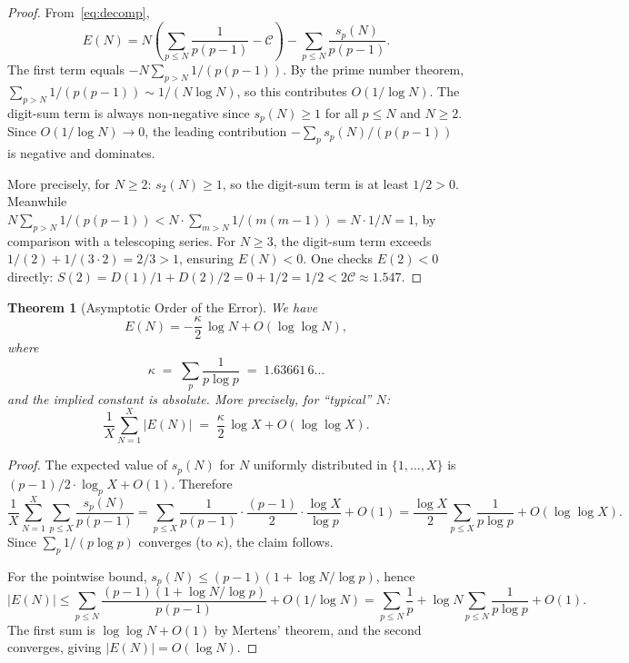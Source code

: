 \documentclass[11pt,a4paper]{amsart}
\theoremstyle{plain}
\newtheorem{theorem}{Theorem}[section]
\theoremstyle{definition}
\begin{document}
\begin{proof}
From~\eqref{eq:decomp},
\[
E(N) = N\!\left(\sum_{p \le N} \frac{1}{p(p-1)} - \mathcal{C}\right) - \sum_{p \le N} \frac{s_p(N)}{p(p-1)}.
\]
The first term equals $-N \sum_{p > N} 1/(p(p-1))$.  By the prime number theorem, $\sum_{p > N} 1/(p(p-1)) \sim 1/(N \log N)$, so this contributes $O(1/\log N)$.  The digit-sum term is always non-negative since $s_p(N) \ge 1$ for all $p \le N$ and $N \ge 2$.  Since $O(1/\log N) \to 0$, the leading contribution $-\sum_p s_p(N)/(p(p-1))$ is negative and dominates.

More precisely, for $N \ge 2$: $s_2(N) \ge 1$, so the digit-sum term is at least $1/2 > 0$.  Meanwhile $N \sum_{p>N} 1/(p(p-1)) < N \cdot \sum_{m > N} 1/(m(m-1)) = N \cdot 1/N = 1$, by comparison with a telescoping series.  For $N \ge 3$, the digit-sum term exceeds $1/(2) + 1/(3 \cdot 2) = 2/3 > 1$, ensuring $E(N) < 0$.  One checks $E(2) < 0$ directly: $S(2) = D(1)/1 + D(2)/2 = 0 + 1/2 = 1/2 < 2\mathcal{C} \approx 1.547$.
\end{proof}

\begin{theorem}[Asymptotic Order of the Error]\label{thm:errororder}
We have
\begin{equation}
E(N) = -\frac{\kappa}{2}\,\log N + O(\log \log N),
\end{equation}
where
\begin{equation}\label{eq:kappa}
\kappa \;=\; \sum_{p} \frac{1}{p \log p} \;=\; 1.63661\,6\ldots
\end{equation}
and the implied constant is absolute.  More precisely, for ``typical'' $N$:
\[
\frac{1}{X} \sum_{N=1}^{X} |E(N)| \;=\; \frac{\kappa}{2}\,\log X + O(\log \log X).
\]
\end{theorem}

\begin{proof}
The expected value of $s_p(N)$ for $N$ uniformly distributed in $\{1, \ldots, X\}$ 
is $(p-1)/2 \cdot \log_p X + O(1)$.  Therefore
\[
\frac{1}{X} \sum_{N=1}^{X} \sum_{p \le X} \frac{s_p(N)}{p(p-1)}
= \sum_{p \le X} \frac{1}{p(p-1)} \cdot \frac{(p-1)}{2} \cdot \frac{\log X}{\log p} + O(1)
= \frac{\log X}{2} \sum_{p \le X} \frac{1}{p \log p} + O(\log \log X).
\]
Since $\sum_p 1/(p \log p)$ converges (to $\kappa$), the claim follows.

For the pointwise bound, $s_p(N) \le (p-1)(1 + \log N / \log p)$, hence
\[
|E(N)| \le \sum_{p \le N} \frac{(p-1)(1 + \log N/\log p)}{p(p-1)} + O(1/\log N)
= \sum_{p \le N} \frac{1}{p} + \log N \sum_{p \le N} \frac{1}{p \log p} + O(1).
\]
The first sum is $\log\log N + O(1)$ by Mertens' theorem, and the second converges, giving $|E(N)| = O(\log N)$.
\end{proof}
\end{document}
